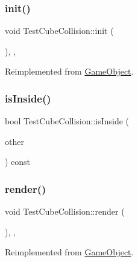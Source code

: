 \subsubsection{\texorpdfstring{init()}{init()}}
{\footnotesize\ttfamily void Test\+Cube\+Collision\+::init (\begin{DoxyParamCaption}{ }\end{DoxyParamCaption})\hspace{0.3cm}{\ttfamily [inline]}, {\ttfamily [override]}, {\ttfamily [virtual]}}



Reimplemented from \hyperlink{class_game_object_aecb2c1b9f69715d854f7604d5d7978ec}{Game\+Object}.

\mbox{\label{class_test_cube_collision_a94a32ad4ffd215b7c16efa866eb31ef2}} 
\subsubsection{\texorpdfstring{is\+Inside()}{isInside()}}
{\footnotesize\ttfamily bool Test\+Cube\+Collision\+::is\+Inside (\begin{DoxyParamCaption}\item[{const \hyperlink{class_game_object}{Game\+Object} $\ast$}]{other }\end{DoxyParamCaption}) const\hspace{0.3cm}{\ttfamily [inline]}}

\mbox{\label{class_test_cube_collision_ae5cd1052745d6acf9cbb2a6bde8b757a}} 
\subsubsection{\texorpdfstring{render()}{render()}}
{\footnotesize\ttfamily void Test\+Cube\+Collision\+::render (\begin{DoxyParamCaption}{ }\end{DoxyParamCaption})\hspace{0.3cm}{\ttfamily [inline]}, {\ttfamily [override]}, {\ttfamily [virtual]}}



Reimplemented from \hyperlink{class_game_object_a484efb66a7a27c101e84c11d9905d7a6}{Game\+Object}.

